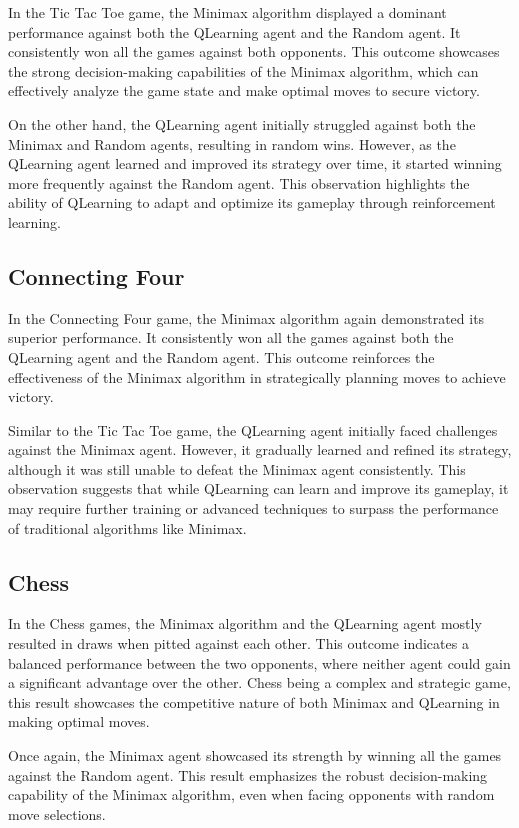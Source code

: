 \documentclass{article}
\begin{document}
In the Tic Tac Toe game, the Minimax algorithm displayed a dominant performance against both the QLearning agent and the Random agent. It consistently won all the games against both opponents. This outcome showcases the strong decision-making capabilities of the Minimax algorithm, which can effectively analyze the game state and make optimal moves to secure victory.

On the other hand, the QLearning agent initially struggled against both the Minimax and Random agents, resulting in random wins. However, as the QLearning agent learned and improved its strategy over time, it started winning more frequently against the Random agent. This observation highlights the ability of QLearning to adapt and optimize its gameplay through reinforcement learning.

\subsection{Connecting Four}

In the Connecting Four game, the Minimax algorithm again demonstrated its superior performance. It consistently won all the games against both the QLearning agent and the Random agent. This outcome reinforces the effectiveness of the Minimax algorithm in strategically planning moves to achieve victory.

Similar to the Tic Tac Toe game, the QLearning agent initially faced challenges against the Minimax agent. However, it gradually learned and refined its strategy, although it was still unable to defeat the Minimax agent consistently. This observation suggests that while QLearning can learn and improve its gameplay, it may require further training or advanced techniques to surpass the performance of traditional algorithms like Minimax.

\subsection{Chess}

In the Chess games, the Minimax algorithm and the QLearning agent mostly resulted in draws when pitted against each other. This outcome indicates a balanced performance between the two opponents, where neither agent could gain a significant advantage over the other. Chess being a complex and strategic game, this result showcases the competitive nature of both Minimax and QLearning in making optimal moves.

Once again, the Minimax agent showcased its strength by winning all the games against the Random agent. This result emphasizes the robust decision-making capability of the Minimax algorithm, even when facing opponents with random move selections.
\end{document}
